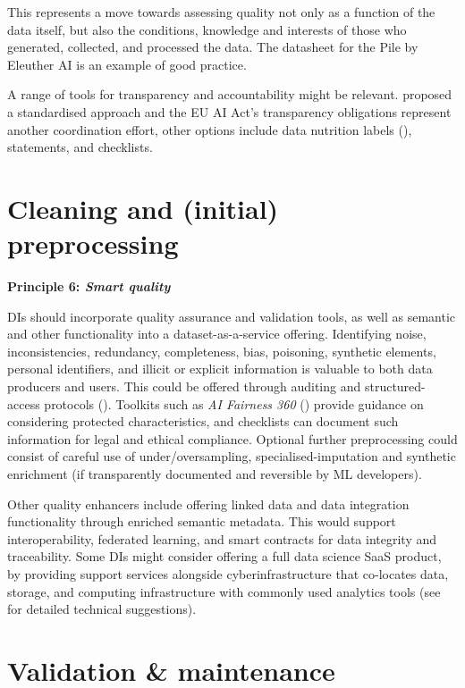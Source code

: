 This represents a move towards assessing quality not only as a function of the data itself, but also the conditions, knowledge and interests of those who generated, collected, and processed the data. The datasheet for the Pile by Eleuther AI is an example of good practice.

A range of tools for transparency and accountability might be relevant. \textcite{gebru2021DatasheetsDatasetsa} proposed a standardised approach and the EU AI Act’s transparency obligations represent another coordination effort, other options include data nutrition labels (\cite{DatasetNutrition}), statements, and checklists.

\section*{Cleaning and (initial) preprocessing}

\textbf{Principle 6: \textit{Smart quality}}

DIs should incorporate quality assurance and validation tools, as well as semantic and other functionality into a dataset-as-a-service offering. Identifying noise, inconsistencies, redundancy, completeness, bias, poisoning, synthetic elements, personal identifiers, and illicit or explicit information is valuable to both data producers and users. This could be offered through auditing and structured-access protocols (\cite{shevlane2022StructuredAccessEmerging}). Toolkits such as \textit{AI Fairness 360} (\cite{bellamy2018AIFairness360}) provide guidance on considering protected characteristics, and checklists can document such information for legal and ethical compliance. Optional further preprocessing could consist of careful use of under/oversampling, specialised-imputation and synthetic enrichment (if transparently documented and reversible by ML developers).

Other quality enhancers include offering linked data and data integration functionality through enriched semantic metadata. This would support interoperability, federated learning, and smart contracts for data integrity and traceability. Some DIs might consider offering a full data science SaaS product, by providing support services alongside cyberinfrastructure that co-locates data, storage, and computing infrastructure with commonly used analytics tools (see \textcite{grossman2016CaseDataCommons} for detailed technical suggestions).

\section*{Validation \& maintenance}


